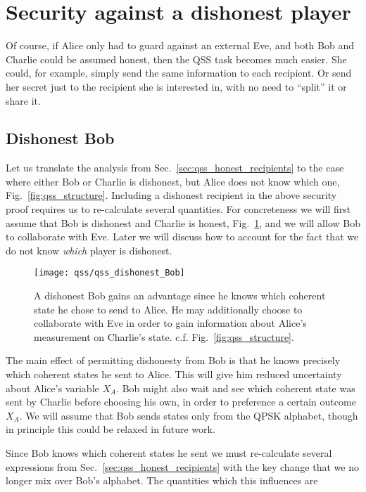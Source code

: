 \section{Security against a dishonest player}\label{sec:qss_dishonest_recipient}
Of course, if Alice only had to guard against an external Eve, and both Bob and Charlie could be assumed honest, then the QSS task becomes much easier. She could, for example, simply send the same information to each recipient. Or send her secret just to the recipient she is interested in, with no need to ``split'' it or share it. 

\subsection{Dishonest Bob}
Let us translate the analysis from Sec.~\ref{sec:qss_honest_recipients} to the case where either Bob or Charlie is dishonest, but Alice does not know which one, Fig.~\ref{fig:qss_structure}. Including a dishonest recipient in the above security proof requires us to re-calculate several quantities. For concreteness we will first assume that Bob is dishonest and Charlie is honest, Fig.~\ref{fig:qss_dishonest_Bob}, and we will allow Bob to collaborate with Eve. Later we will discuss how to account for the fact that we do not know \emph{which} player is dishonest.

\begin{figure}[htp]
\centering
\texttt{[image: qss/qss\_dishonest\_Bob]}
\caption{\label{fig:qss_dishonest_Bob} A dishonest Bob gains an advantage since he knows which coherent state he chose to send to Alice. He may additionally choose to collaborate with Eve in order to gain information about Alice's measurement on Charlie's state. c.f. Fig.~\ref{fig:qss_structure}.}
\end{figure}

The main effect of permitting dishonesty from Bob is that he knows precisely which coherent states he sent to Alice. This will give him reduced uncertainty about Alice's variable $X_A$. Bob might also wait and see which coherent state was sent by Charlie before choosing his own, in order to preference a certain outcome $X_A$.  We will assume that Bob sends states only from the QPSK alphabet, though in principle this could be relaxed in future work.

Since Bob knows which coherent states he sent we must re-calculate several expressions from Sec.~\ref{sec:qss_honest_recipients} with the key change that we no longer mix over Bob's alphabet. The quantities which this influences are

